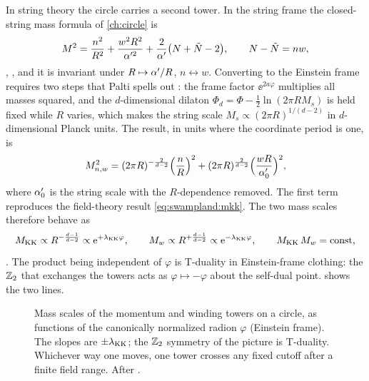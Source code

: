 In string theory the circle carries a second tower. In the string frame the closed-string mass
formula of \cref{ch:circle} is
\begin{equation}\label{eq:swampland:stringmass}
M^2=\frac{n^2}{R^2}+\frac{w^2R^2}{\alpha'^2}+\frac{2}{\alpha'}\big(N+\tilde N-2\big),\qquad
N-\tilde N=nw ,
\end{equation}
, , and it is invariant
under $R\mapsto\alpha'/R$, $n\leftrightarrow w$. Converting to the Einstein frame requires two steps
that Palti spells out : the frame factor $\ee^{2a\varphi}$
multiplies all masses squared, and the $d$-dimensional dilaton $\Phi_d=\Phi-\tfrac12\ln(2\pi RM_s)$
is held fixed while $R$ varies, which makes the string scale $M_s\propto(2\pi R)^{1/(d-2)}$ in
$d$-dimensional Planck units. The result, in units where the coordinate period is one, is
\begin{equation}\label{eq:swampland:einsteinmass}
M_{n,w}^2=(2\pi R)^{-\frac{2}{d-2}}\Big(\frac nR\Big)^2+(2\pi R)^{\frac{2}{d-2}}\Big(\frac{wR}{\alpha'_0}\Big)^2 ,
\end{equation}
where $\alpha'_0$ is the string scale with the $R$-dependence removed. The first term reproduces the
field-theory result \eqref{eq:swampland:mkk}. The two mass scales therefore behave as
\begin{equation}\label{eq:swampland:towers}
M_{\rm KK}\propto R^{-\frac{d-1}{d-2}}\propto\mathrm{e}^{+\lambda_{\rm KK}\varphi},\qquad
M_{w}\propto R^{+\frac{d-1}{d-2}}\propto\mathrm{e}^{-\lambda_{\rm KK}\varphi},\qquad
M_{\rm KK}\,M_w=\text{const} ,
\end{equation}
. The product being independent of $\varphi$ is T-duality
in Einstein-frame clothing: the $\mathbb{Z}_2$ that exchanges the towers acts as $\varphi\mapsto-\varphi$
about the self-dual point.  shows the two lines.

\begin{figure}[ht]
\centering
{}
\caption{Mass scales of the momentum and winding towers on a circle, as functions of the
canonically normalized radion $\varphi$ (Einstein frame). The slopes are $\pm\lambda_{\rm KK}$;
the $\mathbb{Z}_2$ symmetry of the picture is T-duality. Whichever way one moves, one tower crosses any
fixed cutoff after a finite field range. After .}
\label{fig:swampland:towers}
\end{figure}

